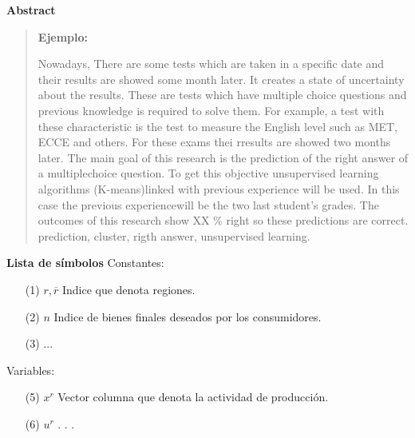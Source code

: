 \newpage
\begin{center}
 {\bf\LARGE Abstract}\vskip 1.5cm
\end{center} 
\begin{quotation}

{\bf Ejemplo:}\par

Nowadays, There are some tests which are taken in a specific date and their results are showed some month later. It creates a state of uncertainty about the results. These are tests which have multiple choice questions and previous knowledge is required to solve them. For example, a test with these characteristic is the test to measure the English level such as MET, ECCE and others. For these exams thei rresults are showed two months later. 
\vskip 0.2cm
The main goal of this research is the prediction of the right answer of a multiplechoice question. To get this objective unsupervised learning algorithms (K-means)linked with previous experience will be used. In this case the previous experiencewill be the two last student’s grades.
The outcomes of this research show XX \% right so these predictions are correct.
\vskip 0.3cm
\hspace*{-0.6cm}{\bf Keywords:} prediction, cluster, rigth answer, unsupervised learning.
\end{quotation}


\newpage
{}
 {\bf\LARGE Lista de símbolos}
 \vskip 1.5cm
Constantes: 
\begin{enumerate}
\item[(1)]$r,\overline{r} $ \hspace*{0.8cm} Indice que denota regiones.
\item[(2)] $n $ \hspace*{1.1cm} Indice de bienes finales deseados por los consumidores.
\item[(3)] ...
\vskip 3cm
\end{enumerate} 
\vskip 0.3cm
Variables:
\begin{enumerate}
\item[(5)] $ x^{r} $ \hspace*{1cm} Vector columna que denota la actividad de producción.
\item[(6)] $ u^{r} $ \hspace*{1.2cm} . . .
\end{enumerate}

